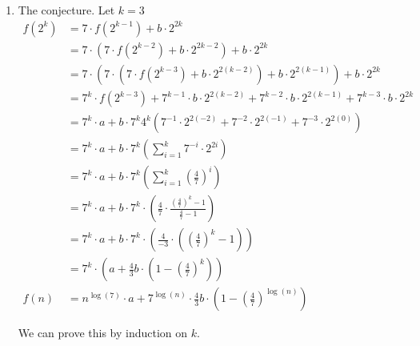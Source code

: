 \documentclass{article}
\begin{document}
\begin{enumerate}
{\begin{enumerate}[label={(\arabic*)}]
{\begin{displaymath}
                    \end{displaymath}
                }
                \item {
                    The conjecture. Let \(k=3\)
                    \begin{displaymath}
                        \begin{aligned}
                            f(2^k) 
                            &= 7\cdot f(2^{k-1}) + b\cdot2^{2k} \\
                            &= 7\cdot \left( 7\cdot f(2^{k-2}) + b\cdot2^{2k-2} \right) + b\cdot2^{2k} \\
                            &= 7\cdot \left( 7\cdot \left( 7\cdot f(2^{k-3}) + b\cdot2^{2(k-2)} \right) + b\cdot2^{2(k-1)} \right) + b\cdot2^{2k} \\
                            &= 7^k \cdot f(2^{k-3}) + 7^{k-1}\cdot b\cdot2^{2(k-2)}+ 7^{k-2}\cdot b\cdot2^{2(k-1)} + 7^{k-3}\cdot b\cdot2^{2k} \\
                            &= 7^k \cdot a + b\cdot7^k4^k\left(7^{-1}\cdot 2^{2(-2)}+ 7^{-2}\cdot2^{2(-1)} + 7^{-3}\cdot2^{2(0)}\right) \\
                            &= 7^k \cdot a + b\cdot7^k\left( \sum_{i=1}^{k} 7^{-i}\cdot 2^{2i} \right) \\
                            &= 7^k \cdot a + b\cdot7^k\left( \sum_{i=1}^{k} \left(\frac47\right)^{i} \right) \\
                            &= 7^k \cdot a + b\cdot7^k\cdot\left( \frac47 \cdot \frac{\left(\frac47\right)^{k} - 1}{\frac47 - 1} \right) \\
                            &= 7^k \cdot a + b\cdot7^k\cdot\left( \frac{4}{-3} \cdot \left(\left(\frac47\right)^{k} - 1\right) \right) \\
                            &= 7^k \cdot \left( a + \frac{4}{3}b \cdot \left(1 - \left(\frac47\right)^{k}\right) \right) \\
                            f(n) &= n^{\log(7)}\cdot a + 7^{\log(n)}\cdot\frac{4}{3}b\cdot\left( 1 - \left(\frac47\right)^{\log(n)} \right)
                        \end{aligned}
                    \end{displaymath}
                    
                    We can prove this by induction on \(k\).

}
\end{enumerate}}
\end{enumerate}
\end{document}
